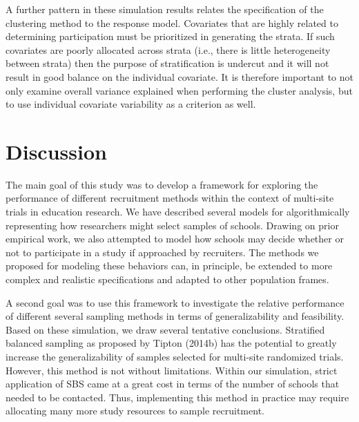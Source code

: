 \documentclass[
  man,floatsintext]{apa6}
\begin{document}
A further pattern in these simulation results relates the specification of the clustering method to the response model. Covariates that are highly related to determining participation must be prioritized in generating the strata. If such covariates are poorly allocated across strata (i.e., there is little heterogeneity between strata) then the purpose of stratification is undercut and it will not result in good balance on the individual covariate. It is therefore important to not only examine overall variance explained when performing the cluster analysis, but to use individual covariate variability as a criterion as well. 

\hypertarget{discussion}{%
\section*{Discussion}\label{discussion}}

The main goal of this study was to develop a framework for exploring the performance of different recruitment methods within the context of multi-site trials in education research. We have described several models for algorithmically representing how researchers might select samples of schools. Drawing on prior empirical work, we also attempted to model how schools may decide whether or not to participate in a study if approached by recruiters. The methods we proposed for modeling these behaviors can, in principle, be extended to more complex and realistic specifications and adapted to other population frames.

A second goal was to use this framework to investigate the relative performance of different several sampling methods in terms of generalizability and feasibility. Based on these simulation, we draw several tentative conclusions. Stratified balanced sampling as proposed by Tipton (2014b) has the potential to greatly increase the generalizability of samples selected for multi-site randomized trials. However, this method is not without limitations. Within our simulation, strict application of SBS came at a great cost in terms of the number of schools that needed to be contacted. Thus, implementing this method in practice may require allocating many more study resources to sample recruitment.
\end{document}
